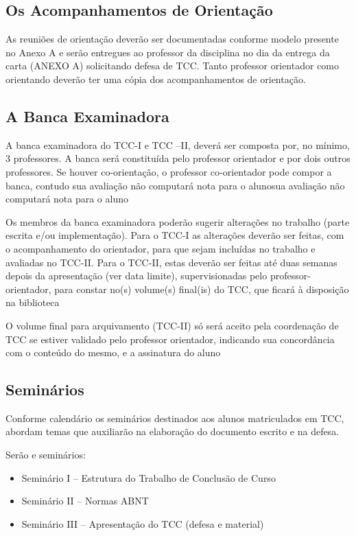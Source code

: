 \subsection{Os Acompanhamentos de Orientação}

As reuniões de orientação deverão ser documentadas conforme modelo presente no Anexo A e serão entregues ao professor da disciplina no dia da entrega da carta (ANEXO A) solicitando defesa de TCC.
Tanto professor orientador como orientando deverão ter uma cópia dos acompanhamentos de orientação.
	

\subsection{A Banca Examinadora}

A banca examinadora do TCC-I e TCC –II, deverá ser composta por, no mínimo, 3 professores. A banca será constituída pelo 
professor orientador e por dois outros professores. Se houver co-orientação, o professor co-orientador pode compor a banca, contudo sua avaliação não computará nota para o alunosua avaliação não computará nota para o aluno 

Os membros da banca examinadora poderão sugerir alterações no trabalho (parte escrita e/ou implementação). Para o TCC-I as alterações deverão ser feitas, com o acompanhamento do orientador, para que sejam incluídas no trabalho e avaliadas no TCC-II. Para o TCC-II, estas deverão ser feitas até duas semanas depois da apresentação (ver data limite), supervisionadas pelo professor-orientador, para constar no(s) volume(s) final(is) do TCC, que ficará à disposição na biblioteca

O volume final para arquivamento (TCC-II) só será aceito pela coordenação de TCC se estiver validado pelo professor orientador, indicando sua concordância com o conteúdo do mesmo, e a assinatura do aluno


\subsection{Seminários}
Conforme calendário os seminários destinados aos alunos matriculados em TCC, abordam temas que auxiliarão na elaboração do documento escrito e na defesa.

Serão e seminários:
	\begin{itemize}
		\item Seminário I – Estrutura do Trabalho de Conclusão de Curso

		\item Seminário II – Normas ABNT

		\item Seminário III – Apresentação do TCC (defesa e material)
	\end{itemize}

